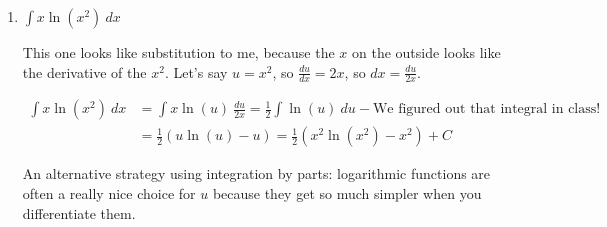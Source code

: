 \begin{enumerate}[leftmargin=0pt]
\begin{enumerate}
    \begin{red}
    This one we'll use integration by parts, specifically because we just figured out how to integrate $x^2\cos(x^3)$. 
    \[
    \begin{array}{ll}
        u = x^3 &  \\
         & dv = x^2\cos(x^3)\ dx
    \end{array}
    \textrm{ so then }
    \begin{array}{ll}
        u = x^3 &  v = \tfrac{1}{3} \sin(x^3)\\
        du = 3x^2\ dx & dv = x^2 \cos(x^3)\ dx 
    \end{array}
    \]
    Using the integration by parts formula:
    \begin{align*}
        \int x^3\cdot (x^2\cos(x^3))\ dx &= x^3\cdot \tfrac{1}{3} \sin(x^3) - \int \tfrac{1}{3} \sin(x^3)\cdot 3x^2\ dx \\
        &= \frac13 x^3 \sin(x^3) - \int\sin(x^3)\cdot x^2\ dx
        \intertext{We'll use the substitution $t = x^3$, $dt = 3x^2\ dx$ to evaluate this second integral.}
        &= \frac13 x^3 \sin(x^3) - \int\sin(t)\ \frac{dt}{3} \\
        &= \frac13 x^3 \sin(x^3) + \frac13 \cos(t) = \frac13 x^3 \sin(x^3) + \frac13 \cos(x^3) + C
    \end{align*}
    \end{red}
    
    \item $\int x\ln(x^2)\ dx$
    
    \begin{red}
    This one looks like substitution to me, because the $x$ on the outside looks like the derivative of the $x^2$. Let's say $u = x^2$, so $\frac{du}{dx} = 2x$, so $dx = \frac{du}{2x}$.
    
    \begin{align*}
        \int x\ln(x^2)\ dx &= \int x \ln(u)\ \frac{du}{2x} = \frac12 \int\ln(u)\ du - \textrm{We figured out that integral in class!}\\
        &= \frac12\left(u\ln(u) - u\right) = \frac12\left(x^2 \ln(x^2) - x^2\right) + C
    \end{align*}
    \end{red}
    
    \begin{blue}
    An alternative strategy using integration by parts: logarithmic functions are often a really nice choice for $u$ because they get so much simpler when you differentiate them.
    

\end{blue}
\end{enumerate}
\end{enumerate}
